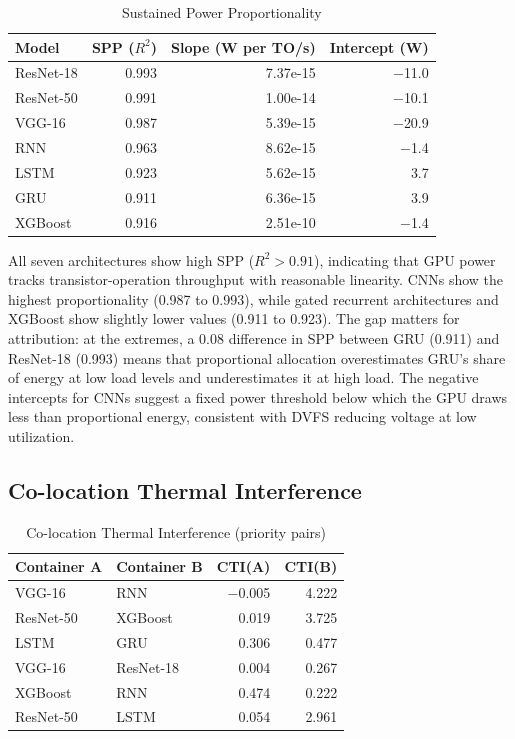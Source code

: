 \documentclass[conference]{IEEEtran}
\begin{document}
\begin{table}[t]
\centering
\caption{Sustained Power Proportionality}
\label{tab:spp}
\small
\begin{tabular}{lrrr}
\toprule
\textbf{Model} & \textbf{SPP ($R^2$)} & \textbf{Slope (W per TO/s)} & \textbf{Intercept (W)} \\
\midrule
ResNet-18 & 0.993 & 7.37e-15 & $-$11.0 \\
ResNet-50 & 0.991 & 1.00e-14 & $-$10.1 \\
VGG-16 & 0.987 & 5.39e-15 & $-$20.9 \\
RNN & 0.963 & 8.62e-15 & $-$1.4 \\
LSTM & 0.923 & 5.62e-15 & 3.7 \\
GRU & 0.911 & 6.36e-15 & 3.9 \\
XGBoost & 0.916 & 2.51e-10 & $-$1.4 \\
\bottomrule
\end{tabular}
\end{table}

All seven architectures show high SPP ($R^2 > 0.91$), indicating that GPU power tracks transistor-operation throughput with reasonable linearity. CNNs show the highest proportionality (0.987 to 0.993), while gated recurrent architectures and XGBoost show slightly lower values (0.911 to 0.923). The gap matters for attribution: at the extremes, a 0.08 difference in SPP between GRU (0.911) and ResNet-18 (0.993) means that proportional allocation overestimates GRU's share of energy at low load levels and underestimates it at high load. The negative intercepts for CNNs suggest a fixed power threshold below which the GPU draws less than proportional energy, consistent with DVFS reducing voltage at low utilization.

\subsection{Co-location Thermal Interference}
\label{sec:colocation}

\begin{table}[t]
\centering
\caption{Co-location Thermal Interference (priority pairs)}
\label{tab:cti}
\small
\begin{tabular}{llrr}
\toprule
\textbf{Container A} & \textbf{Container B} & \textbf{CTI(A)} & \textbf{CTI(B)} \\
\midrule
VGG-16 & RNN & $-$0.005 & 4.222 \\
ResNet-50 & XGBoost & 0.019 & 3.725 \\
LSTM & GRU & 0.306 & 0.477 \\
VGG-16 & ResNet-18 & 0.004 & 0.267 \\
XGBoost & RNN & 0.474 & 0.222 \\
ResNet-50 & LSTM & 0.054 & 2.961 \\
\bottomrule
\end{tabular}
\end{table}
\end{document}
